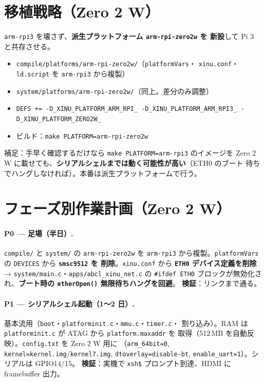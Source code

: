 \documentclass[a4paper,11pt]{ltjsarticle}
\newcommand{\cmd}[1]{\texttt{#1}}
\begin{document}
\section{移植戦略（Zero 2 W）}
\texttt{arm-rpi3} を壊さず、\textbf{派生プラットフォーム \texttt{arm-rpi-zero2w} を
新設}して Pi 3 と共存させる。

\begin{itemize}[noitemsep]
  \item \texttt{compile/platforms/arm-rpi-zero2w/}（\texttt{platformVars}・
        \texttt{xinu.conf}・\texttt{ld.script} を \texttt{arm-rpi3} から複製）
  \item \texttt{system/platforms/arm-rpi-zero2w/}（同上。差分のみ調整）
  \item \texttt{DEFS += -D\_XINU\_PLATFORM\_ARM\_RPI\_ -D\_XINU\_PLATFORM\_ARM\_RPI3\_
        -D\_XINU\_PLATFORM\_ZERO2W\_}
  \item ビルド：\cmd{make PLATFORM=arm-rpi-zero2w}
\end{itemize}

\noindent 補足：手早く確認するだけなら \cmd{make PLATFORM=arm-rpi3} のイメージを
Zero 2 W に載せても、\textbf{シリアルシェルまでは動く可能性が高い}（ETH0 のブート
待ちでハングしなければ）。本番は派生プラットフォームで行う。

\section{フェーズ別作業計画（Zero 2 W）}

\paragraph{P0 — 足場（半日）.}
\texttt{compile/} と \texttt{system/} の \texttt{arm-rpi-zero2w} を \texttt{arm-rpi3}
から複製。\texttt{platformVars} の \texttt{DEVICES} から \textbf{\texttt{smsc9512} を
削除}。\texttt{xinu.conf} から \textbf{\texttt{ETH0} デバイス定義を削除} →
\texttt{system/main.c}・\texttt{apps/abcl\_xinu\_net.c} の \texttt{\#ifdef ETH0}
ブロックが無効化され、\textbf{ブート時の \texttt{etherOpen()} 無限待ちハングを回避}。
\textbf{検証}：リンクまで通る。

\paragraph{P1 — シリアルシェル起動（1〜2 日）.}
基本流用（\texttt{boot}・\texttt{platforminit.c}・\texttt{mmu.c}・\texttt{timer.c}・
割り込み）。RAM は \texttt{platforminit.c} が ATAG から \texttt{platform.maxaddr} を
取得（512\,MB を自動反映）。\texttt{config.txt} を Zero 2 W 用に
（\texttt{arm\_64bit=0}, \texttt{kernel=kernel.img}/\texttt{kernel7.img},
\texttt{dtoverlay=disable-bt}, \texttt{enable\_uart=1}）。シリアルは GPIO14/15。
\textbf{検証}：実機で \cmd{xsh\$} プロンプト到達、HDMI に framebuffer 出力。
\end{document}
